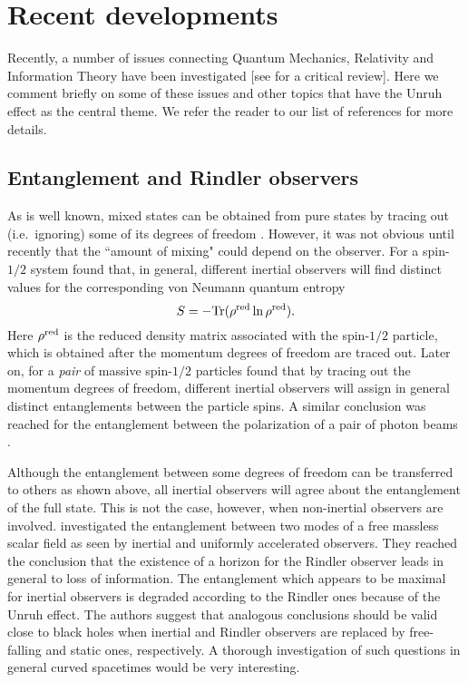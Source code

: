\documentclass[12pt,nofootinbib,floatfix,aps,prd,showpacs,amsmath,amssymb,eqsecnum]{revtex4-2}
\let\cite\citep
\begin{document}
\section{Recent developments}
\label{section:Recentdevelopments}

Recently, a number of issues connecting Quantum Mechanics,
Relativity and Information Theory have been investigated
[see \textcite{Peresetal04} for a critical review]. Here we 
comment briefly on some of these issues and other topics
that have the Unruh effect as the central theme. 
We refer the reader to our list of references for more details.

\subsection{Entanglement and Rindler observers }
\label{subsection:Entanglement}

As is well known, mixed states can be obtained from pure
states by tracing out (i.e.~ignoring) some of its degrees 
of freedom \cite{Zurek91}. However, it 
was not obvious until recently that the ``amount of mixing" 
could depend on the observer. For a spin-$1/2$ system
\textcite{Peresetal02} found that, in general, different 
inertial observers will find distinct values for the 
corresponding von Neumann quantum entropy 
$$
S= - {\rm Tr} (\rho^{\rm red} \ln \rho^{\rm red} ).
$$ 
Here $\rho^{\rm red}$ is the reduced density 
matrix associated with the spin-$1/2$ particle, which is 
obtained after the momentum degrees of freedom 
are traced out. 
Later on, for a {\em pair} of massive spin-$1/2$ 
particles \textcite{Gingrichetal02} found that by 
tracing out the momentum degrees of freedom, different inertial 
observers will assign in general distinct entanglements 
between the particle spins. A similar conclusion was reached
for the entanglement between the polarization of a pair 
of photon beams \cite{Gingrichetal03}. 

Although the entanglement between some degrees of freedom 
can be transferred to others as shown above, all inertial
observers will agree about the entanglement of the full state.
This is not the case, however, when non-inertial observers
are involved. \textcite{Fuentes-Schulleretal05} investigated 
the entanglement between two modes of a free massless scalar
field as seen by inertial and uniformly accelerated observers.
They reached the conclusion that the existence of a horizon for 
the Rindler observer leads in general to loss of information. 
The entanglement which appears to be maximal for inertial 
observers is degraded according to the Rindler ones because of 
the Unruh effect. The authors suggest that analogous conclusions 
should be valid close to black holes when inertial and Rindler 
observers are replaced by free-falling and static ones, 
respectively. A thorough investigation of such questions in 
general curved spacetimes would be very interesting.
\end{document}
